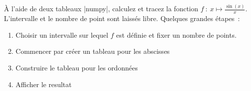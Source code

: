 		À l'aide de deux tableaux \python|numpy|, calculez et tracez la fonction $f~:\ x \mapsto \frac{\sin(x)}{x}$. L'intervalle et le nombre de point sont laissés libre.
		Quelques grandes étapes~:
		\begin{enumerate}
			\item Choisir un intervalle sur lequel $f$ est définie et fixer un nombre de points.
			\item Commencer par créer un tableau pour les abscisses
			\item Construire le tableau pour les ordonnées
			\item Afficher le resultat
		\end{enumerate}
	
	